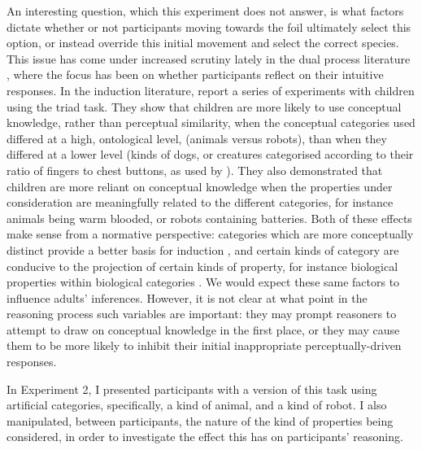 An interesting question, which this experiment does not answer,
is what factors dictate whether or not participants
moving towards the foil ultimately select this option,
or instead override this initial movement and select the correct species.
This issue has come under increased scrutiny lately in the dual process literature
\citep[see, for instance,][]{Thompson2014a,Thompson2011,DeNeys2012,Pennycook2015},
where the focus has been on whether participants
reflect on their intuitive responses.
In the induction literature,
\citet{Gelman2013c} report a series of experiments with children
using the triad task.
They show that children are more likely to
use conceptual knowledge, rather than perceptual similarity,
when the conceptual categories used differed at a high, ontological level,
(animals versus robots),
than when they differed at a lower level (kinds of dogs, or creatures categorised
according to their ratio of fingers to chest buttons,
as used by \citealp{Sloutsky2007}).
They also demonstrated that children are more reliant
on conceptual knowledge when the properties under consideration
are meaningfully related to the different categories,
for instance animals being warm blooded, or robots containing batteries.
Both of these effects make sense from a normative perspective:
categories which are more conceptually distinct
provide a better basis for induction \citep{Rosch1976},
and certain kinds of category are conducive to
the projection of certain kinds of property,
for instance biological properties within biological categories
\citep{Heit1994,Shipley1993,Shafto2007}.
We would expect these same factors to influence adults' inferences.
However, it is not clear at what point in the reasoning process
such variables are important:
they may prompt reasoners to attempt
to draw on conceptual knowledge in the first place,
or they may cause them to be more likely to inhibit
their initial inappropriate perceptually-driven responses.

In Experiment 2, I presented participants with a version of this task
using artificial categories, specifically, a kind of animal, and a kind of robot.
I also manipulated, between participants,
the nature of the kind of properties being considered,
in order to investigate the effect this has on participants' reasoning.
